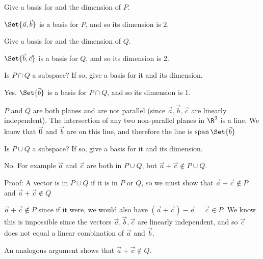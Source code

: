 \documentclass{problemset}
\begin{document}
	\begin{parts}
		\item Give a basis for and the dimension of $P$.
			\begin{solution}
				$\Set{\vec a,\vec b}$ is a basis for $P$, and so its dimension is 2.
			\end{solution}
		\item Give a basis for and the dimension of $Q$.
			\begin{solution}
				$\Set{\vec b,\vec c}$ is a basis for $Q$, and so its dimension is 2.
			\end{solution}
		\item Is $P\cap Q$ a subspace? If so, give a basis for it and its dimension.
			\begin{solution}
				Yes. $\Set{\vec b}$ is a basis for $P\cap Q$, and so its dimension is 1.

				$P$ and $Q$ are both planes and are not parallel (since
				$\vec a,\vec b,\vec c$ are linearly independent). The intersection
				of any two non-parallel	planes in $\R^3$ is a line.
				We know that $\vec 0$ and $\vec b$ are on this line, and therefore
				the line is $\Span\Set{\vec b}$
			\end{solution}
		\item Is $P\cup Q$ a subspace? If so, give a basis for it and its dimension.
			\begin{solution}
				No. For example $\vec a$ and $\vec c$ are both in $P\cup Q$, but
				$\vec a+\vec c \notin P\cup Q$.

				Proof: A vector is in $P\cup Q$ if it is in $P$ or $Q$, so we must show
				that $\vec a+\vec c\notin P$ and $\vec a+\vec c\notin Q$

				$\vec a+\vec c \notin P$ since if it were, we would also have
				$(\vec a+\vec c)-\vec a=\vec c\in P$. We know this is impossible
				since the vectors $\vec a,\vec b,\vec c$ are linearly independent,
				and so $\vec c$ does not equal a linear combination of $\vec a$
				and $\vec b$.

				An analogous argument shows that $\vec a+\vec c \notin Q$.
			\end{solution}
	\end{parts}
\end{document}
